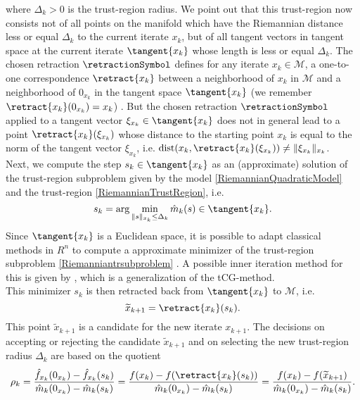 where $\Delta_k > 0$ is the trust-region radius. We point out that this trust-region now consists not of all points on the manifold which have the Riemannian distance less or equal $\Delta_k$ to the current iterate $x_k$, but of all tangent vectors in tangent space at the current iterate $\tangent{x_k}$ whose length is less or equal $\Delta_k$. The chosen retraction $\retractionSymbol$ defines for any iterate $x_k \in \mathcal{M}$, a one-to-one correspondence $\retract{x_k}$ between a neighborhood of $x_k$ in $\mathcal{M}$ and a neighborhood of $0_{x_k}$ in the tangent space $\tangent{x_k}$ (we remember $\retract{x_k}(0_{x_k}) = x_k$) \cite[p.~304]{AbsilBakerGallivan:2007}. But the chosen retraction $\retractionSymbol$ applied to a tangent vector $\xi_{x_k} \in \tangent{x_k}$ does not in general lead to a point $\retract{x_k}(\xi_{x_k})$ whose distance to the starting point $x_k$ is equal to the norm of the tangent vector $\xi_{x_k}$, i.e. $\operatorname{dist}(x_k, \retract{x_k}(\xi_{x_k})) \neq \lVert \xi_{x_k} \rVert_{x_k}$. \\
Next, we compute the step $s_k \in \tangent{x_k}$ as an (approximate) solution of the trust-region subproblem given by the model \cref{RiemannianQuadraticModel} and the trust-region \cref{RiemannianTrustRegion}, i.e.
\begin{equation}\label{Riemanniantrsubproblem}
    s_k = \arg \min_{\lVert s \rVert_{x_k} \leq \Delta_k} \hat{m}_k( s ) \in \tangent{x_k}.
\end{equation}
Since $\tangent{x_k}$ is a Euclidean space, it is possible to adapt classical methods in $R^n$ to compute a approximate minimizer of the trust-region subproblem \cref{Riemanniantrsubproblem} \cite[p.~304]{AbsilBakerGallivan:2007}. A possible inner iteration method for this is given by \cite[Algorithm~11]{AbsilMahonySepulchre:2008}, which is a generalization of the tCG-method. \\
This minimizer $s_k$ is then retracted back from $\tangent{x_k}$ to $\mathcal{M}$, i.e.
\begin{equation*}
    \widetilde{x}_{k+1} = \retract{x_k}(s_k).
\end{equation*}
This point $\widetilde{x}_{k+1}$ is a candidate for the new iterate $x_{k+1}$. The decisions on accepting or rejecting the candidate $\widetilde{x}_{k+1}$ and on selecting the new trust-region radius $\Delta_k$ are based on the quotient
\begin{equation*}
    \rho_k = \frac{\hat{f}_{x_k}(0_{x_k}) - \hat{f}_{x_k}(s_k)}{\hat{m}_k(0_{x_k}) - \hat{m}_k(s_k)} = \frac{f(x_k) - f(\retract{x_k}(s_k))}{\hat{m}_k(0_{x_k}) - \hat{m}_k(s_k)} = \frac{f(x_k) - f(\widetilde{x}_{k+1})}{\hat{m}_k(0_{x_k}) - \hat{m}_k(s_k)}.
\end{equation*}
